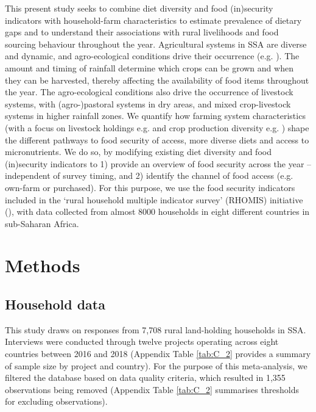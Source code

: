 This present study seeks to combine diet diversity and food (in)security indicators with household-farm characteristics to estimate prevalence of dietary gaps and to understand their associations with rural livelihoods and food sourcing behaviour throughout the year. Agricultural systems in SSA are diverse and dynamic, and agro-ecological conditions drive their occurrence (e.g. \citealp{Garrity2012}). The amount and timing of rainfall determine which crops can be grown and when they can be harvested, thereby affecting the availability of food items throughout the year. The agro-ecological conditions also drive the occurrence of livestock systems, with (agro-)pastoral systems in dry areas, and mixed crop-livestock systems in higher rainfall zones. We quantify how farming system characteristics (with a focus on livestock holdings e.g. \citealp{Headey2018} and crop production diversity e.g. \citealp{Jones2016}) shape the different pathways to food security of access, more diverse diets and access to micronutrients. We do so, by modifying existing diet diversity and food (in)security indicators to 1) provide an overview of food security across the year -- independent of survey timing, and 2) identify the channel of food access (e.g. own-farm or purchased). For this purpose, we use the food security indicators included in the `rural household multiple indicator survey' (RHOMIS) initiative (\citealp{Hammond2017225}), with data collected from almost 8000 households in eight different countries in sub-Saharan Africa.

\section{Methods}

\subsection{Household data}

This study draws on responses from 7,708 rural land-holding households in SSA. Interviews were conducted through twelve projects operating across eight countries between 2016 and 2018 (Appendix Table \ref{tab:C_2} provides a summary of sample size by project and country). For the purpose of this meta-analysis, we filtered the database based on data quality criteria, which resulted in 1,355 observations being removed (Appendix Table \ref{tab:C_2} summarises thresholds for excluding observations).

